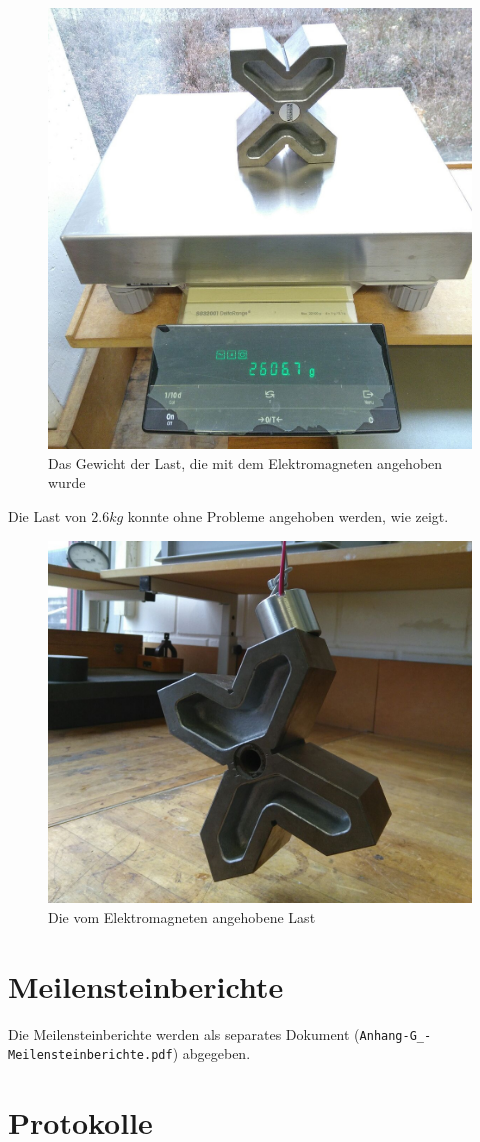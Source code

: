 \begin{figure}[]
    \centering
    \includegraphics[width=0.5\linewidth]{pics/waage.jpg}
    \caption{Das Gewicht der Last, die mit dem Elektromagneten angehoben wurde}
    \label{fig:waage}
\end{figure}

Die Last von $2.6kg$ konnte ohne Probleme angehoben werden, wie  zeigt.

\begin{figure}[]
    \centering
    \includegraphics[width=0.5\linewidth]{pics/anheben.jpg}
    \caption{Die vom Elektromagneten angehobene Last}
    \label{fig:anheben}
\end{figure}

\section{Meilensteinberichte}

Die Meilensteinberichte werden als separates Dokument (\texttt{Anhang-G\_\hyp{Meilen\-stein\-berichte.pdf}}) abgegeben.

\section{Protokolle}

